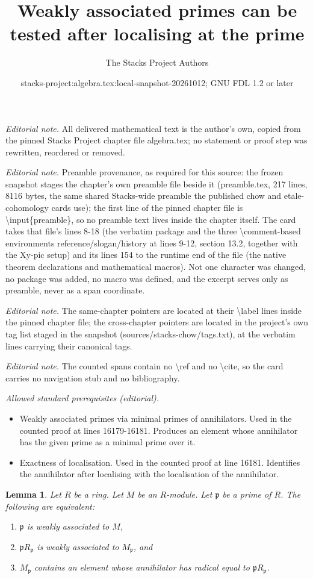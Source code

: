 \documentclass[10pt,a4paper]{amsart}
\title{Weakly associated primes can be tested after localising at the prime}
\author{The Stacks Project Authors}
\date{stacks-project:algebra.tex:local-snapshot-20261012; GNU FDL 1.2 or later}
\theoremstyle{plain}
\newtheorem{lemma}[subsection]{Lemma}
\theoremstyle{definition}
\theoremstyle{remark}
\numberwithin{equation}{subsection}
\begin{document}
\maketitle
\noindent\textit{Editorial note.} All delivered mathematical text is the author's own, copied from the pinned Stacks Project chapter file algebra.tex; no statement or proof step was rewritten, reordered or removed.\par\medskip
\noindent\textit{Editorial note.} Preamble provenance, as required for this source: the frozen snapshot stages the chapter's own preamble file beside it (preamble.tex, 217 lines, 8116 bytes, the same shared Stacks-wide preamble the published chow and etale-cohomology cards use); the first line of the pinned chapter file is \textbackslash{}input\{preamble\}, so no preamble text lives inside the chapter itself. The card takes that file's lines 8-18 (the verbatim package and the three \textbackslash{}comment-based environments reference/slogan/history at lines 9-12, section 13.2, together with the Xy-pic setup) and its lines 154 to the runtime end of the file (the native theorem declarations and mathematical macros). Not one character was changed, no package was added, no macro was defined, and the excerpt serves only as preamble, never as a span coordinate.\par\medskip
\noindent\textit{Editorial note.} The same-chapter pointers are located at their \textbackslash{}label lines inside the pinned chapter file; the cross-chapter pointers are located in the project's own tag list staged in the snapshot (sources/stacks-chow/tags.txt), at the verbatim lines carrying their canonical tags.\par\medskip
\noindent\textit{Editorial note.} The counted spans contain no \textbackslash{}ref and no \textbackslash{}cite, so the card carries no navigation stub and no bibliography.\par\medskip
\noindent\textit{Allowed standard prerequisites (editorial).}\begin{itemize}
\item Weakly associated primes via minimal primes of annihilators. Used in the counted proof at lines 16179-16181. Produces an element whose annihilator has the given prime as a minimal prime over it.
\item Exactness of localisation. Used in the counted proof at line 16181. Identifies the annihilator after localising with the localisation of the annihilator.
\end{itemize}\medskip
\begin{lemma}
\label{lemma-weakly-ass-local}
Let $R$ be a ring. Let $M$ be an $R$-module.
Let $\mathfrak p$ be a prime of $R$.
The following are equivalent:
\begin{enumerate}
\item $\mathfrak p$ is weakly associated to $M$,
\item $\mathfrak pR_{\mathfrak p}$ is weakly associated to $M_{\mathfrak p}$,
and
\item $M_{\mathfrak p}$ contains an element whose
annihilator has radical equal to $\mathfrak pR_{\mathfrak p}$.
\end{enumerate}
\end{lemma}
\end{document}
